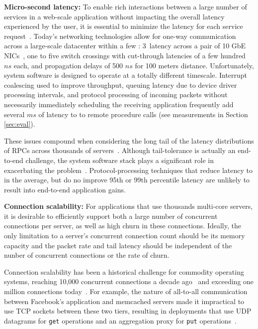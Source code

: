 {\bf Micro-second latency:} To enable rich interactions between a
large number of services in a web-scale application without impacting
the overall latency experienced by the user, it is essential to
minimize the latency for each service
request~\cite{luiz-isscc,Rumble:2011:TLL}. Today's networking
technologies allow for one-way communication across a large-scale
datacenter within a few \microsecond : 3~\microsecond latency across
a pair of 10 GbE NICs~\cite{cisco-sereno}, one to five switch
crossings with cut-through latencies of a few hundred $ns$ each, and
propagation delays of 500 $ns$ for 100 meters distance. Unfortunately,
system software is designed to operate at a totally different
timescale. Interrupt coalescing used to improve throughput, queuing
latency due to device driver processing intervals, and protocol
processing of incoming packets without necessarily immediately
scheduling the receiving application frequently add several $ms$ of
latency to to remote procedure calls (see measurements in Section
\ref{sec:eval}).


These issues compound when considering the long tail of the latency
distributions of RPCs across thousands of
servers~\cite{DBLP:journals/cacm/DeanB13}. Although tail-tolerance is
actually an end-to-end challenge, the system software stack plays a
significant role in exacerbating the problem~\cite{Leverich:RHSU:2014}.
Protocol-processing techniques that reduce latency to \microsecond in
the average, but do no improve 95th or 99th percentile latency are
unlikely to result into end-to-end application gains.

{\bf Connection scalability:} For applications that use thousands
multi-core servers, it is desirable to efficiently support both a
large number of concurrent connections per server, as well as high
churn in these connections.  Ideally, the only limitation to a
server's concurrent connection count should be its memory capacity and
the packet rate and tail latency should be independent of the nunber
of concurrent connections or the rate of churn.
 
Connection scalability has been a historical challenge for commodity
operating systems, reaching 10,000 concurrent connections a decade
ago~\cite{theC10Kproblem} and exceeding one million connections
today~\cite{theC10Mproblem}. For example, the nature of all-to-all
communication between Facebook's application and memcached servers
made it impractical to use TCP sockets between these two tiers,
resulting in deployments that use UDP datagrams for \texttt{get}
operations and an aggregation proxy for \texttt{put}
operations~\cite{nishtala2013scaling}.

